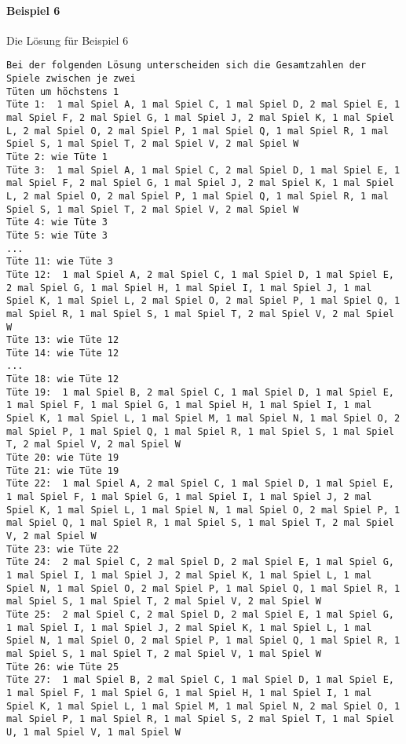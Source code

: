 \documentclass[a4paper,10pt,ngerman]{scrartcl}
\begin{document}
\paragraph{Beispiel 6}
Die Lösung für Beispiel 6
\begin{lstlisting}[frame=tb,breaklines=true]
Bei der folgenden Lösung unterscheiden sich die Gesamtzahlen der Spiele zwischen je zwei 
Tüten um höchstens 1
Tüte 1:  1 mal Spiel A, 1 mal Spiel C, 1 mal Spiel D, 2 mal Spiel E, 1 mal Spiel F, 2 mal Spiel G, 1 mal Spiel J, 2 mal Spiel K, 1 mal Spiel L, 2 mal Spiel O, 2 mal Spiel P, 1 mal Spiel Q, 1 mal Spiel R, 1 mal Spiel S, 1 mal Spiel T, 2 mal Spiel V, 2 mal Spiel W
Tüte 2: wie Tüte 1
Tüte 3:  1 mal Spiel A, 1 mal Spiel C, 2 mal Spiel D, 1 mal Spiel E, 1 mal Spiel F, 2 mal Spiel G, 1 mal Spiel J, 2 mal Spiel K, 1 mal Spiel L, 2 mal Spiel O, 2 mal Spiel P, 1 mal Spiel Q, 1 mal Spiel R, 1 mal Spiel S, 1 mal Spiel T, 2 mal Spiel V, 2 mal Spiel W
Tüte 4: wie Tüte 3
Tüte 5: wie Tüte 3
...
Tüte 11: wie Tüte 3
Tüte 12:  1 mal Spiel A, 2 mal Spiel C, 1 mal Spiel D, 1 mal Spiel E, 2 mal Spiel G, 1 mal Spiel H, 1 mal Spiel I, 1 mal Spiel J, 1 mal Spiel K, 1 mal Spiel L, 2 mal Spiel O, 2 mal Spiel P, 1 mal Spiel Q, 1 mal Spiel R, 1 mal Spiel S, 1 mal Spiel T, 2 mal Spiel V, 2 mal Spiel W
Tüte 13: wie Tüte 12
Tüte 14: wie Tüte 12
...
Tüte 18: wie Tüte 12
Tüte 19:  1 mal Spiel B, 2 mal Spiel C, 1 mal Spiel D, 1 mal Spiel E, 1 mal Spiel F, 1 mal Spiel G, 1 mal Spiel H, 1 mal Spiel I, 1 mal Spiel K, 1 mal Spiel L, 1 mal Spiel M, 1 mal Spiel N, 1 mal Spiel O, 2 mal Spiel P, 1 mal Spiel Q, 1 mal Spiel R, 1 mal Spiel S, 1 mal Spiel T, 2 mal Spiel V, 2 mal Spiel W
Tüte 20: wie Tüte 19
Tüte 21: wie Tüte 19
Tüte 22:  1 mal Spiel A, 2 mal Spiel C, 1 mal Spiel D, 1 mal Spiel E, 1 mal Spiel F, 1 mal Spiel G, 1 mal Spiel I, 1 mal Spiel J, 2 mal Spiel K, 1 mal Spiel L, 1 mal Spiel N, 1 mal Spiel O, 2 mal Spiel P, 1 mal Spiel Q, 1 mal Spiel R, 1 mal Spiel S, 1 mal Spiel T, 2 mal Spiel V, 2 mal Spiel W
Tüte 23: wie Tüte 22
Tüte 24:  2 mal Spiel C, 2 mal Spiel D, 2 mal Spiel E, 1 mal Spiel G, 1 mal Spiel I, 1 mal Spiel J, 2 mal Spiel K, 1 mal Spiel L, 1 mal Spiel N, 1 mal Spiel O, 2 mal Spiel P, 1 mal Spiel Q, 1 mal Spiel R, 1 mal Spiel S, 1 mal Spiel T, 2 mal Spiel V, 2 mal Spiel W
Tüte 25:  2 mal Spiel C, 2 mal Spiel D, 2 mal Spiel E, 1 mal Spiel G, 1 mal Spiel I, 1 mal Spiel J, 2 mal Spiel K, 1 mal Spiel L, 1 mal Spiel N, 1 mal Spiel O, 2 mal Spiel P, 1 mal Spiel Q, 1 mal Spiel R, 1 mal Spiel S, 1 mal Spiel T, 2 mal Spiel V, 1 mal Spiel W
Tüte 26: wie Tüte 25
Tüte 27:  1 mal Spiel B, 2 mal Spiel C, 1 mal Spiel D, 1 mal Spiel E, 1 mal Spiel F, 1 mal Spiel G, 1 mal Spiel H, 1 mal Spiel I, 1 mal Spiel K, 1 mal Spiel L, 1 mal Spiel M, 1 mal Spiel N, 2 mal Spiel O, 1 mal Spiel P, 1 mal Spiel R, 1 mal Spiel S, 2 mal Spiel T, 1 mal Spiel U, 1 mal Spiel V, 1 mal Spiel W

\end{lstlisting}
\end{document}
